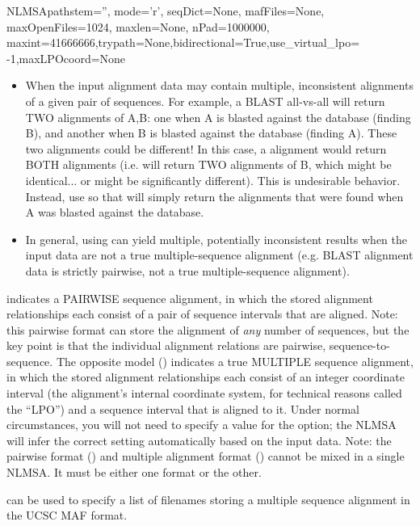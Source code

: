 \documentclass{howto}
\begin{document}
\begin{funcdesc}{NLMSA}{pathstem='', mode='r', seqDict=None, mafFiles=None, maxOpenFiles=1024, maxlen=None, nPad=1000000, maxint=41666666,trypath=None,bidirectional=True,use_virtual_lpo= -1,maxLPOcoord=None}
\begin{itemize}
\item When the input alignment data may contain multiple, inconsistent alignments of
a given pair of sequences.  For example, a BLAST all-vs-all will return TWO alignments
of A,B: one when A is blasted against the database (finding B), and another when 
B is blasted against the database (finding A).  These two alignments could be different!
In this case, a  alignment would return BOTH alignments
(i.e.  will return TWO alignments of B, which might be identical...
or might be significantly different).  This is undesirable behavior.  Instead,
use  so that  will simply return the 
alignments that were found when A was blasted against the database.

\item In general, using  can yield multiple, potentially
inconsistent results when the input data are not a true multiple-sequence alignment
(e.g. BLAST alignment data is strictly pairwise, not a true multiple-sequence alignment).
\end{itemize}

   indicates a PAIRWISE sequence alignment, in which
  the stored alignment relationships each consist of a pair of sequence intervals
  that are aligned.  Note: this pairwise format can store the alignment of {\em any}
  number of sequences, but the key point is that the individual alignment relations
  are pairwise, sequence-to-sequence.  The opposite model ()
  indicates a true MULTIPLE sequence alignment, in which the stored alignment
  relationships each consist of an integer coordinate interval (the alignment's internal
  coordinate system, for technical reasons called the ``LPO'') and a sequence
  interval that is aligned to it.  Under normal circumstances, you will not need
  to specify a value for the  option; the NLMSA will infer
  the correct setting automatically based on the input data.  Note: the pairwise format
  () and multiple alignment format ()
  cannot be mixed in a single NLMSA.  It must be either one format or the other.

   can be used to specify a list of
  filenames storing a multiple sequence alignment in the UCSC MAF format.


\end{funcdesc}
\end{document}
